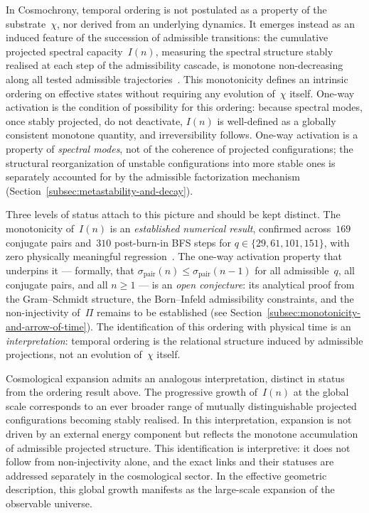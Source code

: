   In Cosmochrony, temporal ordering is not postulated as a property of the
  substrate~$\chi$, nor derived from an underlying dynamics.
  It emerges instead as an induced feature of the succession of admissible
  transitions: the cumulative projected spectral capacity~$I(n)$, measuring the
  spectral structure stably realised at each step of the admissibility cascade, is
  monotone non-decreasing along all tested admissible trajectories~\cite{Beau2026pto}.
  This monotonicity defines an intrinsic ordering on effective states without
  requiring any evolution of~$\chi$ itself.
  One-way activation is the condition of possibility for this ordering: because
  spectral modes, once stably projected, do not deactivate, $I(n)$ is
  well-defined as a globally consistent monotone quantity, and irreversibility
  follows.
  One-way activation is a property of \emph{spectral modes}, not of the
  coherence of projected configurations; the structural reorganization of
  unstable configurations into more stable ones is separately accounted for
  by the admissible factorization mechanism
  (Section~\ref{subsec:metastability-and-decay}).

  Three levels of status attach to this picture and should be kept distinct.
  The monotonicity of~$I(n)$ is an \emph{established numerical result}, confirmed
  across~$169$ conjugate pairs and~$310$ post-burn-in BFS steps for
  $q \in \{29, 61, 101, 151\}$, with zero physically meaningful
  regression~\cite{Beau2026pto}.
  The one-way activation property that underpins it --- formally, that
  $\sigma_{\mathrm{pair}}(n) \le \sigma_{\mathrm{pair}}(n-1)$ for all
  admissible~$q$, all conjugate pairs, and all $n \ge 1$ --- is an
  \emph{open conjecture}: its analytical proof from the Gram--Schmidt structure,
  the Born--Infeld admissibility constraints, and the non-injectivity of~$\Pi$
  remains to be established
  (see Section~\ref{subsec:monotonicity-and-arrow-of-time}).
  The identification of this ordering with physical time is an
  \emph{interpretation}: temporal ordering is the relational structure induced
  by admissible projections, not an evolution of~$\chi$ itself.

  Cosmological expansion admits an analogous interpretation, distinct in status
  from the ordering result above.
  The progressive growth of~$I(n)$ at the global scale corresponds to an ever
  broader range of mutually distinguishable projected configurations becoming
  stably realised.
  In this interpretation, expansion is not driven by an external energy component
  but reflects the monotone accumulation of admissible projected structure.
  This identification is interpretive: it does not follow from non-injectivity
  alone, and the exact links and their statuses are addressed separately in the
  cosmological sector.
  In the effective geometric description, this global growth manifests as the
  large-scale expansion of the observable universe.
